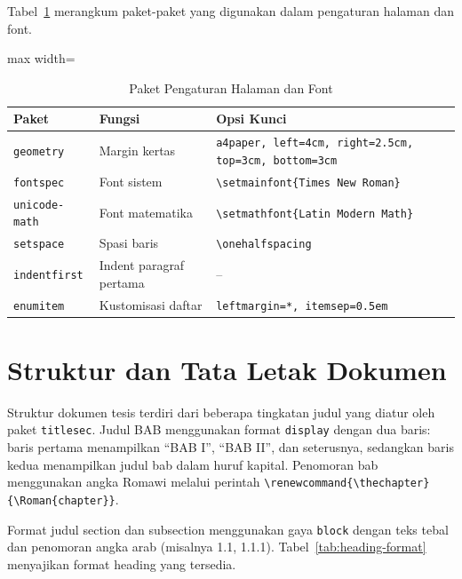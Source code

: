 Tabel~\ref{tab:paket-halaman} merangkum paket-paket yang digunakan dalam pengaturan halaman dan font.

\begin{table}[h]
  \centering
  \caption{Paket Pengaturan Halaman dan Font}
  \label{tab:paket-halaman}
  \begin{adjustbox}{max width=\textwidth}
  \begin{tabular}{lll}
    \toprule
    \textbf{Paket} & \textbf{Fungsi} & \textbf{Opsi Kunci} \\
    \midrule
    \texttt{geometry} & Margin kertas & \texttt{a4paper, left=4cm, right=2.5cm, top=3cm, bottom=3cm} \\
    \texttt{fontspec} & Font sistem & \texttt{\textbackslash setmainfont\{Times New Roman\}} \\
    \texttt{unicode-math} & Font matematika & \texttt{\textbackslash setmathfont\{Latin Modern Math\}} \\
    \texttt{setspace} & Spasi baris & \texttt{\textbackslash onehalfspacing} \\
    \texttt{indentfirst} & Indent paragraf pertama & -- \\
    \texttt{enumitem} & Kustomisasi daftar & \texttt{leftmargin=*, itemsep=0.5em} \\
    \bottomrule
  \end{tabular}
  \end{adjustbox}
\end{table}

\section{Struktur dan Tata Letak Dokumen}

Struktur dokumen tesis terdiri dari beberapa tingkatan judul yang diatur oleh paket \texttt{titlesec}. Judul BAB menggunakan format \texttt{display} dengan dua baris: baris pertama menampilkan ``BAB I'', ``BAB II'', dan seterusnya, sedangkan baris kedua menampilkan judul bab dalam huruf kapital. Penomoran bab menggunakan angka Romawi melalui perintah \texttt{\textbackslash renewcommand\{\textbackslash thechapter\}\{\textbackslash Roman\{chapter\}\}}.

Format judul section dan subsection menggunakan gaya \texttt{block} dengan teks tebal dan penomoran angka arab (misalnya 1.1, 1.1.1). Tabel~\ref{tab:heading-format} menyajikan format heading yang tersedia.

